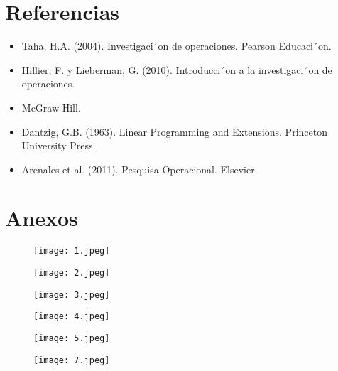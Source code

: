 \documentclass[12pt]{article}
\begin{document}
  \section{Referencias}
  \begin{itemize}
      
\item Taha, H.A. (2004). Investigaci´on de operaciones. Pearson Educaci´on.
\item Hillier, F. y Lieberman, G. (2010). Introducci´on a la investigaci´on de operaciones.
\item McGraw-Hill.
\item Dantzig, G.B. (1963). Linear Programming and Extensions. Princeton University Press.
\item Arenales et al. (2011). Pesquisa Operacional. Elsevier.
 \end{itemize}
 \newpage
 
 \section{Anexos}
\begin{figure}[htbp]
\centering

\begin{minipage}[b]{0.48\textwidth}
  \centering
  \texttt{[image: 1.jpeg]}
  
\end{minipage}
\hfill
\begin{minipage}[b]{0.48\textwidth}
  \centering
  \texttt{[image: 2.jpeg]}
 
\end{minipage}

\vspace{1cm}

\begin{minipage}[b]{0.48\textwidth}
  \centering
  \texttt{[image: 3.jpeg]}
  
\end{minipage}
\hfill
\begin{minipage}[b]{0.48\textwidth}
  \centering
  \texttt{[image: 4.jpeg]}
 
\end{minipage}

\end{figure}

\newpage %
\begin{figure}[htbp]
\centering
\begin{minipage}[b]{0.48\textwidth}
  \centering
  \texttt{[image: 5.jpeg]}
 
\end{minipage}
\hfill
\begin{minipage}[b]{0.48\textwidth}
  \centering
  \texttt{[image: 7.jpeg]}
  
\end{minipage}

\vspace{1cm}
\end{figure}
\end{document}

